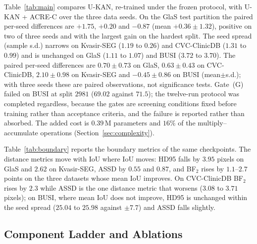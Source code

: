 Table~\ref{tab:main} compares U-KAN, re-trained under the frozen protocol, with U-KAN + ACRE-C over the three data seeds. On the GlaS test partition the paired per-seed differences are $+1.75$, $+0.20$ and $-0.87$ (mean $+0.36\pm1.32$), positive on two of three seeds and with the largest gain on the hardest split.  The seed spread (sample s.d.) narrows on Kvasir-SEG ($1.19$ to $0.26$) and CVC-ClinicDB ($1.31$ to $0.99$) and is unchanged on GlaS ($1.11$ to $1.07$) and BUSI ($3.72$ to $3.70$). The paired per-seed differences are $0.70\pm0.73$ on GlaS, $0.63\pm0.43$ on CVC-ClinicDB, $2.10\pm0.98$ on Kvasir-SEG and $-0.45\pm0.86$ on BUSI (mean$\pm$s.d.); with three seeds these are paired observations, not significance tests. Gate~(G) failed on BUSI at split $2981$ ($69.02$ against $71.5$); the twelve-run protocol was completed regardless, because the gates are screening conditions fixed before training rather than acceptance criteria, and the failure is reported rather than absorbed.  The added cost is $0.39$\,M parameters and $16\%$ of the multiply--accumulate operations (Section~\ref{sec:complexity}).





Table~\ref{tab:boundary} reports the boundary metrics of the same checkpoints. The distance metrics move with IoU where IoU moves: HD95 falls by $3.95$ pixels on GlaS and $2.62$ on Kvasir-SEG, ASSD by $0.55$ and $0.87$, and BF$_2$ rises by $1.1$--$2.7$ points on the three datasets whose mean IoU improves. On CVC-ClinicDB BF$_2$ rises by $2.3$ while ASSD is the one distance metric that worsens ($3.08$ to $3.71$ pixels); on BUSI, where mean IoU does not improve, HD95 is unchanged within the seed spread ($25.04$ to $25.98$ against $\pm 7.7$) and ASSD falls slightly.

\subsection{Component Ladder and Ablations}
\label{sec:ablation}

